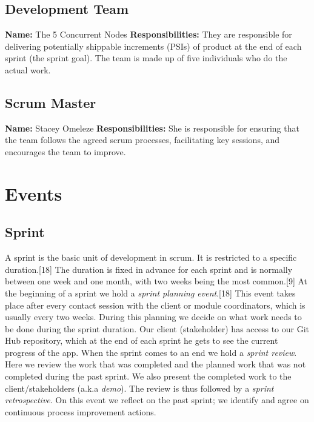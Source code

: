 \documentclass[hidelinks, 12pt, oneside]{article}
\begin{document}
 	\subsection{Development Team}
 	\textbf{Name:} The 5 Concurrent Nodes\newline
	\textbf{Responsibilities:} They are responsible for delivering potentially shippable increments (PSIs) of product at the end of each sprint (the sprint goal). 
	The team
	is made up of five individuals who do the actual work.
	\subsection{Scrum Master}
 	\textbf{Name:} Stacey Omeleze\newline
	\textbf{Responsibilities:} She is responsible for ensuring that the team follows the agreed scrum processes, facilitating key sessions, and encourages 
	the team to improve.\newpage
	
	\section{Events}
	\subsection{Sprint}
	A sprint is the basic unit of development in scrum. It is restricted to a specific duration.[18] The duration is fixed in advance for each sprint and is 
	normally between one week and one month, with two weeks being the most common.[9]\newline\newline
	At the beginning of a sprint we hold a \emph{sprint planning event}.[18] This event takes place after every contact session with the client or module coordinators,
	which is usually every two weeks. During this planning we decide on what work needs to be done during the sprint duration. Our client (stakeholder) has access 
	to our Git Hub repository, which at the end of each sprint he gets to see the current progress of the app.\newline
	When the sprint comes to an end we hold a \emph{sprint review}. Here we review the work that was completed and the planned work that was not completed during the 
	past sprint. We also present the completed work to the client/stakeholders (a.k.a \emph{demo}).\newline
	The review is thus followed by a \emph{sprint retrospective}. On this event we reflect on the past sprint; we identify and agree on continuous process improvement actions. 
\end{document}
